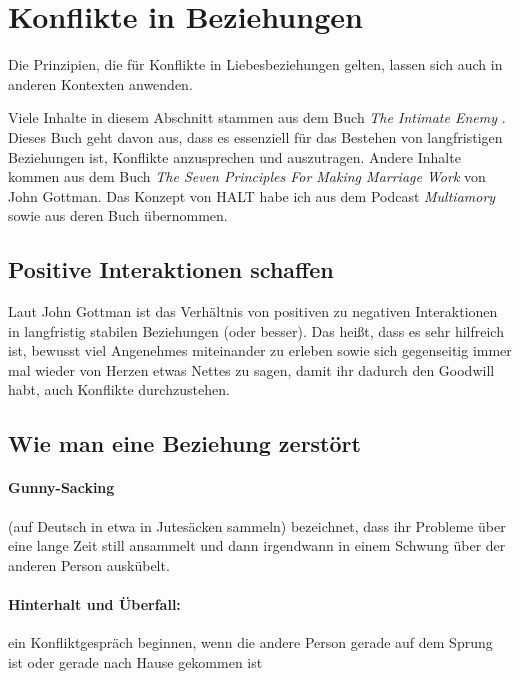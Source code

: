 \section{Konflikte in Beziehungen}
\label{konflikte-in-beziehungen}

Die Prinzipien, die für Konflikte in Liebesbeziehungen gelten, lassen sich auch in anderen Kontexten anwenden.

Viele Inhalte in diesem Abschnitt stammen aus dem Buch \emph{The Intimate Enemy} \cite{intimate-enemy}. Dieses Buch geht davon aus, dass es essenziell für das Bestehen von langfristigen Beziehungen ist, Konflikte anzusprechen und auszutragen. Andere Inhalte kommen aus dem Buch \emph{The Seven Principles For Making Marriage Work} \cite{gottman-7-principles} von John Gottman. Das Konzept von HALT habe ich aus dem Podcast \emph{Multiamory} \cite{halt-multiamory} sowie aus deren Buch \cite{multiamory-book} übernommen.

\subsection{Positive Interaktionen schaffen}

Laut John Gottman ist das Verhältnis von positiven zu negativen Interaktionen in langfristig stabilen Beziehungen  (oder besser). Das heißt, dass es sehr hilfreich ist, bewusst viel Angenehmes miteinander zu erleben sowie sich gegenseitig immer mal wieder von Herzen etwas Nettes zu sagen, damit ihr dadurch den Goodwill habt, auch Konflikte durchzustehen.

\subsection{Wie man eine Beziehung zerstört}

\paragraph{Gunny-Sacking} (auf Deutsch in etwa \glqq in Jutesäcken sammeln\grqq) bezeichnet, dass ihr Probleme über eine lange Zeit still ansammelt und dann irgendwann in einem Schwung über der anderen Person auskübelt.

\paragraph{Hinterhalt und Überfall:} ein Konfliktgespräch beginnen, wenn die andere Person gerade auf dem Sprung ist oder gerade nach Hause gekommen ist


